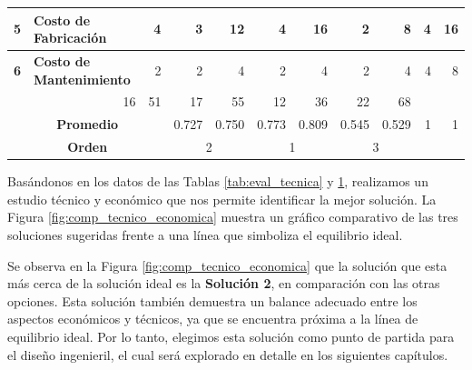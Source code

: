 \begin{table}[h]
{\begin{tabular}{|c|c|c|c|c|c|c|c|c|c|c|}
		\hline
		\textbf{5} & \multicolumn{1}{l|}{\textbf{Costo de Fabricación}} & \multicolumn{1}{r|}{4} & \multicolumn{1}{r|}{\cellcolor[rgb]{ .949,  .863,  .859}3} & \multicolumn{1}{r|}{12} & \multicolumn{1}{r|}{\cellcolor[rgb]{ .863,  .902,  .945}4} & \multicolumn{1}{r|}{16} & \multicolumn{1}{r|}{\cellcolor[rgb]{ .922,  .945,  .871}2} & \multicolumn{1}{r|}{8} & \multicolumn{1}{r|}{\cellcolor[rgb]{ .992,  .914,  .851}4} & \multicolumn{1}{r|}{16} \bigstrut\\
		\hline
		\textbf{6} & \multicolumn{1}{l|}{\textbf{Costo de Mantenimiento}} & \multicolumn{1}{r|}{2} & \multicolumn{1}{r|}{\cellcolor[rgb]{ .949,  .863,  .859}2} & \multicolumn{1}{r|}{4} & \multicolumn{1}{r|}{\cellcolor[rgb]{ .863,  .902,  .945}2} & \multicolumn{1}{r|}{4} & \multicolumn{1}{r|}{\cellcolor[rgb]{ .922,  .945,  .871}2} & \multicolumn{1}{r|}{4} & \multicolumn{1}{r|}{\cellcolor[rgb]{ .992,  .914,  .851}4} & \multicolumn{1}{r|}{8} \bigstrut\\
		\hline
		\rowcolor[rgb]{ .851,  .851,  .851} \multicolumn{3}{|c|}{\textbf{Suma}} & \multicolumn{1}{r|}{16} & \multicolumn{1}{r|}{51} & \multicolumn{1}{r|}{17} & \multicolumn{1}{r|}{55} & \multicolumn{1}{r|}{12} & \multicolumn{1}{r|}{36} & \multicolumn{1}{r|}{22} & \multicolumn{1}{r|}{68} \bigstrut\\
		\hline
		\multicolumn{3}{|c|}{\textbf{Promedio}} & \multicolumn{1}{r|}{0.727} & \multicolumn{1}{r|}{\cellcolor[rgb]{ 1,  1,  0}0.750} & \multicolumn{1}{r|}{0.773} & \multicolumn{1}{r|}{\cellcolor[rgb]{ 1,  1,  0}0.809} & \multicolumn{1}{r|}{0.545} & \multicolumn{1}{r|}{\cellcolor[rgb]{ 1,  1,  0}0.529} & \multicolumn{1}{r|}{1} & \multicolumn{1}{r|}{\cellcolor[rgb]{ 1,  1,  0}1} \bigstrut\\
		\hline
		\multicolumn{3}{|c|}{\textbf{Orden}} & \multicolumn{2}{c|}{2} & \multicolumn{2}{c|}{1} & \multicolumn{2}{c|}{3} & \multicolumn{2}{c|}{} \bigstrut\\
		\hline
	\end{tabular}%
	}
	\label{tab:eval_economica}%
\end{table}%


Basándonos en los datos de las Tablas \ref{tab:eval_tecnica} y \ref{tab:eval_economica}, realizamos un estudio técnico y económico que nos permite identificar la mejor solución. La Figura \ref{fig:comp_tecnico_economica} muestra un gráfico comparativo de las tres soluciones sugeridas frente a una línea que simboliza el equilibrio ideal.

Se observa en la Figura \ref{fig:comp_tecnico_economica} que la solución que esta más cerca de la solución ideal es la \textbf{Solución 2}, en comparación con las otras opciones. Esta solución también demuestra un balance adecuado entre los aspectos económicos y técnicos, ya que se encuentra próxima a la línea de equilibrio ideal. Por lo tanto, elegimos esta solución como punto de partida para el diseño ingenieril, el cual será explorado en detalle en los siguientes capítulos.

